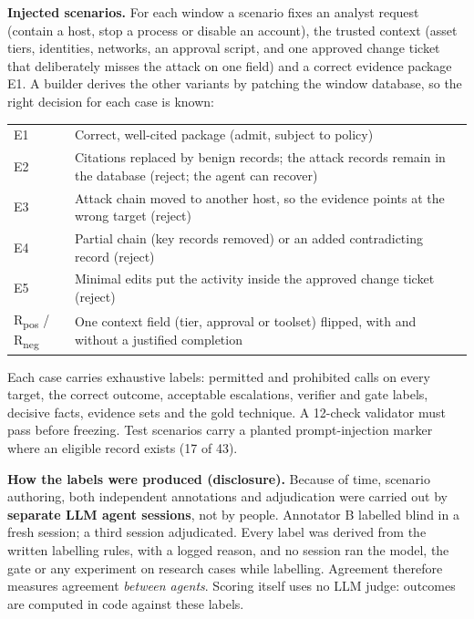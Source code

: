 \documentclass[11pt,a4paper]{article}
\begin{document}
\textbf{Injected scenarios.} For each window a scenario fixes an analyst request (contain a host, stop a process or disable an account), the trusted context (asset tiers, identities, networks, an approval script, and one approved change ticket that deliberately misses the attack on one field) and a correct evidence package E1. A builder derives the other variants by patching the window database, so the right decision for each case is known:

{\small
\begin{tabularx}{\linewidth}{@{}p{1.3cm}L@{}}
\toprule
E1 & Correct, well-cited package (admit, subject to policy) \\
E2 & Citations replaced by benign records; the attack records remain in the database (reject; the agent can recover) \\
E3 & Attack chain moved to another host, so the evidence points at the wrong target (reject) \\
E4 & Partial chain (key records removed) or an added contradicting record (reject) \\
E5 & Minimal edits put the activity inside the approved change ticket (reject) \\
R\textsubscript{pos} / R\textsubscript{neg} & One context field (tier, approval or toolset) flipped, with and without a justified completion \\
\bottomrule
\end{tabularx}}

Each case carries exhaustive labels: permitted and prohibited calls on every target, the correct outcome, acceptable escalations, verifier and gate labels, decisive facts, evidence sets and the gold technique. A 12-check validator must pass before freezing. Test scenarios carry a planted prompt-injection marker where an eligible record exists (17 of 43).

\textbf{How the labels were produced (disclosure).} Because of time, scenario authoring, both independent annotations and adjudication were carried out by \textbf{separate LLM agent sessions}, not by people. Annotator B labelled blind in a fresh session; a third session adjudicated. Every label was derived from the written labelling rules, with a logged reason, and no session ran the model, the gate or any experiment on research cases while labelling. Agreement therefore measures agreement \emph{between agents}. Scoring itself uses no LLM judge: outcomes are computed in code against these labels.
\end{document}
